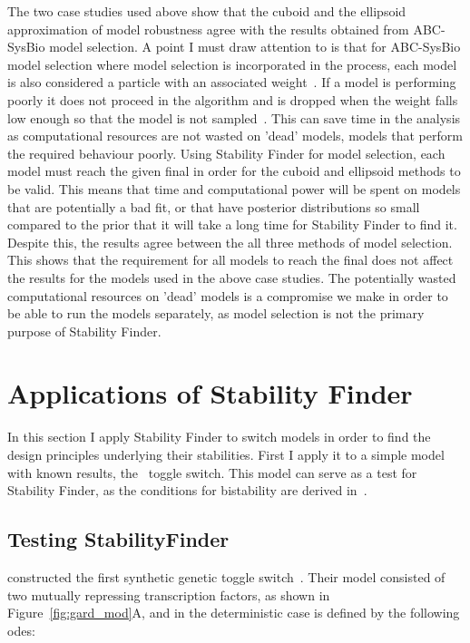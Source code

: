 The two case studies used above show that the cuboid and the ellipsoid approximation of model robustness agree with the results obtained from ABC-SysBio model selection. A point I must draw attention to is that for ABC-SysBio model selection where model selection is incorporated in the process, each model is also considered a particle with an associated weight~\autocite{Toni:2009tr}. If a model is performing poorly it does not proceed in the algorithm and is dropped when the weight falls low enough so that the model is not sampled~\autocite{Toni:2009tr}. This can save time in the analysis as computational resources are not wasted on 'dead' models, models that perform the required behaviour poorly. Using Stability Finder for model selection, each model must reach the given final \textepsilon{} in order for the cuboid and ellipsoid methods to be valid. This means that time and computational power will be spent on models that are potentially a bad fit, or that have posterior distributions so small compared to the prior that it will take a long time for Stability Finder to find it. Despite this, the results agree between the all three methods of model selection. This shows that the requirement for all models to reach the final \textepsilon{} does not affect the results for the models used in the above case studies. The potentially wasted computational resources on 'dead' models is a compromise we make in order to be able to run the models separately, as model selection is not the primary purpose of Stability Finder. 

\section{Applications of Stability Finder}

In this section I apply Stability Finder to switch models in order to find the design principles underlying their stabilities. First I apply it to a simple model with known results, the~\textcite{Gardner:2000vha} toggle switch. This model can serve as a test for Stability Finder, as the conditions for bistability are derived in~\textcite{Gardner:2000vha}.


\subsection{Testing StabilityFinder}
\label{sec:gard}
\textcite{Gardner:2000vha} constructed the first synthetic genetic toggle switch~\autocite{Gardner:2000vha}. Their model consisted of two mutually repressing transcription factors, as shown in Figure~\ref{fig:gard_mod}A, and in the deterministic case is defined by the following \acrshort{ode}s:

